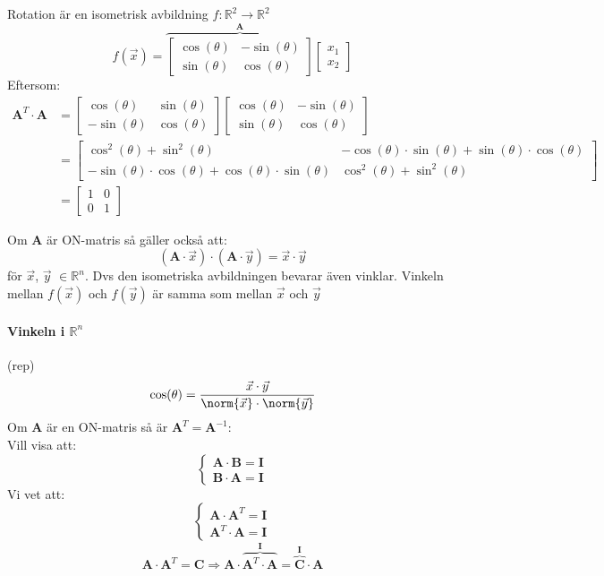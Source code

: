 \begin{Ex}
	Rotation är en isometrisk avbildning $f:\mathbb{R}^2 \rightarrow \mathbb{R}^2$
	\[
	f(\vec{x}) =
	\overbrace{
	\begin{bmatrix}
		\cos(\theta) & -\sin(\theta)\\
		\sin(\theta) & \cos(\theta)
	\end{bmatrix}
	}^\mathbf{A}
	\begin{bmatrix} x_1\\x_2 \end{bmatrix}
	\]
	Eftersom:
	\begin{align*}
	\mathbf{A}^T \cdot \mathbf{A} &=
	\begin{bmatrix}
		\cos(\theta) & \sin(\theta)\\
		-\sin(\theta) & \cos(\theta)
	\end{bmatrix}
	\begin{bmatrix}
		\cos(\theta) & -\sin(\theta)\\
		\sin(\theta) & \cos(\theta)
	\end{bmatrix}
	\\
	&=
	\begin{bmatrix}
		\cos^2(\theta) + \sin^2(\theta) & -\cos(\theta) \cdot \sin(\theta) + \sin(\theta) \cdot \cos(\theta)\\
		-\sin(\theta) \cdot \cos(\theta) + \cos(\theta) \cdot \sin(\theta) & \cos^2(\theta) + \sin^2(\theta)
	\end{bmatrix}
	\\
	&=
	\begin{bmatrix} 1&0\\0&1 \end{bmatrix}
	\end{align*}
\end{Ex}
Om \textbf{A} är ON-matris så gäller också att:
\[
(\mathbf{A} \cdot \vec{x}) \cdot (\mathbf{A} \cdot \vec{y}) = \vec{x} \cdot \vec{y}
\]
för $\vec{x}$, $\vec{y}$ $\in \mathbb{R}^n$. Dvs den isometriska avbildningen bevarar även vinklar. Vinkeln mellan $f(\vec{x})$ och $f(\vec{y})$ är samma som mellan $\vec{x}$ och $\vec{y}$
\paragraph{Vinkeln i $\mathbb{R}^n$} %
  \label{par:vinkeln_i_}
  (rep)
  \[
  \cos(\theta) = \frac{\vec{x} \cdot \vec{y}}{\norm{\vec{x}} \cdot \norm{\vec{y}}}
  \]
Om \textbf{A} är en ON-matris så är $\mathbf{A}^T = \mathbf{A}^{-1}$:\\
Vill visa att:
\[
\begin{cases}
  	\mathbf{A} \cdot \mathbf{B} = \mathbf{I}\\
  	\mathbf{B} \cdot \mathbf{A} = \mathbf{I}
  \end{cases}  
\]  
Vi vet att:
\[
\begin{cases}
	\mathbf{A} \cdot \mathbf{A}^T = \mathbf{I}\\
	\mathbf{A}^T \cdot \mathbf{A} = \mathbf{I}
\end{cases}
\]
\[
\mathbf{A} \cdot \mathbf{A}^T = \mathbf{C} \Rightarrow \mathbf{A} \cdot \overbrace{\mathbf{A}^T \cdot \mathbf{A}}^\mathbf{I} = \overbrace{\mathbf{C}}^\mathbf{I} \cdot \mathbf{A}
\]



